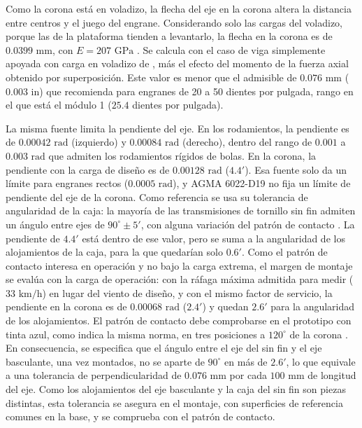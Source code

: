 \documentclass[../../General.tex]{subfiles}
\begin{document}
Como la corona está en voladizo, la flecha del eje en la corona altera la distancia entre centros y el juego del engrane. Considerando solo las cargas del voladizo, porque las de la plataforma tienden a levantarlo, la flecha en la corona es de $0.0399\text{ mm}$, con $E = 207\text{ GPa}$ \citep{Shigley11th}. Se calcula con el caso de viga simplemente apoyada con carga en voladizo de \citet{Shigley11th}, más el efecto del momento de la fuerza axial obtenido por superposición. Este valor es menor que el admisible de $0.076\text{ mm}$ ($0.003\text{ in}$) que recomienda \citet{Shigley11th} para engranes de 20 a 50 dientes por pulgada, rango en el que está el módulo 1 ($25.4$ dientes por pulgada).

La misma fuente limita la pendiente del eje. En los rodamientos, la pendiente es de $0.00042\text{ rad}$ (izquierdo) y $0.00084\text{ rad}$ (derecho), dentro del rango de $0.001$ a $0.003\text{ rad}$ que admiten los rodamientos rígidos de bolas. En la corona, la pendiente con la carga de diseño es de $0.00128\text{ rad}$ ($4.4'$). Esa fuente solo da un límite para engranes rectos ($0.0005\text{ rad}$), y AGMA 6022-D19 no fija un límite de pendiente del eje de la corona. Como referencia se usa su tolerancia de angularidad de la caja: la mayoría de las transmisiones de tornillo sin fin admiten un ángulo entre ejes de $90^\circ \pm 5'$, con alguna variación del patrón de contacto \citep{agma6022_2019}. La pendiente de $4.4'$ está dentro de ese valor, pero se suma a la angularidad de los alojamientos de la caja, para la que quedarían solo $0.6'$. Como el patrón de contacto interesa en operación y no bajo la carga extrema, el margen de montaje se evalúa con la carga de operación: con la ráfaga máxima admitida para medir ($33\text{ km/h}$) en lugar del viento de diseño, y con el mismo factor de servicio, la pendiente en la corona es de $0.00068\text{ rad}$ ($2.4'$) y quedan $2.6'$ para la angularidad de los alojamientos. El patrón de contacto debe comprobarse en el prototipo con tinta azul, como indica la misma norma, en tres posiciones a $120^\circ$ de la corona \citep{agma6022_2019}.
En consecuencia, se especifica que el ángulo entre el eje del sin fin y el eje basculante, una vez montados, no se aparte de $90^\circ$ en más de $2.6'$, lo que equivale a una tolerancia de perpendicularidad de $0.076\text{ mm}$ por cada $100\text{ mm}$ de longitud del eje. Como los alojamientos del eje basculante y la caja del sin fin son piezas distintas, esta tolerancia se asegura en el montaje, con superficies de referencia comunes en la base, y se comprueba con el patrón de contacto.
\end{document}
